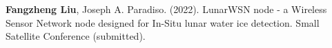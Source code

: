 \textbf{Fangzheng Liu}, Joseph A. Paradiso. (2022). LunarWSN node - a Wireless Sensor Network node designed for In-Situ lunar water ice detection. Small Satellite Conference (submitted).